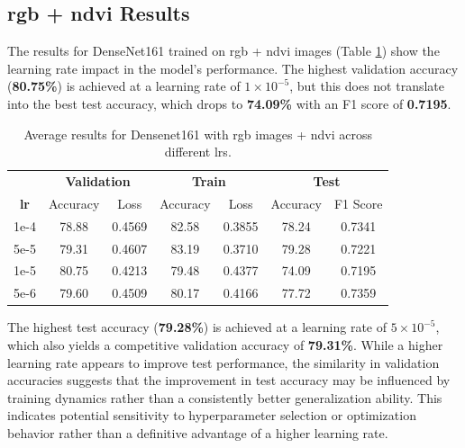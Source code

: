 
\subsection{\gls{rgb} + \gls{ndvi} Results}

The results for DenseNet161 trained on \gls{rgb} + \gls{ndvi} images (Table \ref{tab:densenet161_rgb_ndvi}) 
show the learning rate impact in the model's performance. The highest 
validation accuracy (\textbf{80.75\%}) is achieved at a learning rate of $1\times10^{-5}$, 
but this does not translate into the best test accuracy, which drops to \textbf{74.09\%} 
with an F1 score of \textbf{0.7195}.

\begin{table}[h]
    \centering
    \renewcommand{\arraystretch}{1.3}
    \setlength{\tabcolsep}{8pt}
    \begin{tabular}{|c|cccccc|}
        \hline
        & \multicolumn{2}{c}{\textbf{Validation}} & \multicolumn{2}{c}{\textbf{Train}} & \multicolumn{2}{c|}{\textbf{Test}} \\
        \textbf{\gls{lr}} & Accuracy & Loss & Accuracy & Loss & Accuracy & F1 Score \\
        \hline
        1e-4  & 78.88 & 0.4569 & 82.58 & 0.3855 & 78.24 & 0.7341 \\
        5e-5  & 79.31 & 0.4607 & 83.19 & 0.3710 & 79.28 & 0.7221 \\
        1e-5  & 80.75 & 0.4213 & 79.48 & 0.4377 & 74.09 & 0.7195 \\
        5e-6  & 79.60 & 0.4509 & 80.17 & 0.4166 & 77.72 & 0.7359 \\
        \hline
    \end{tabular}
    \caption{Average results for Densenet161 with \gls{rgb} images + \gls{ndvi} across different \glspl{lr}.}
    \label{tab:densenet161_rgb_ndvi}
\end{table}

The highest test accuracy (\textbf{79.28\%}) is achieved at a learning rate of $5\times10^{-5}$, 
which also yields a competitive validation accuracy of \textbf{79.31\%}. While a higher learning 
rate appears to improve test performance, the similarity in validation accuracies suggests that the 
improvement in test accuracy may be influenced by training dynamics rather than a consistently 
better generalization ability. This indicates potential sensitivity to hyperparameter selection 
or optimization behavior rather than a definitive advantage of a higher learning rate.


